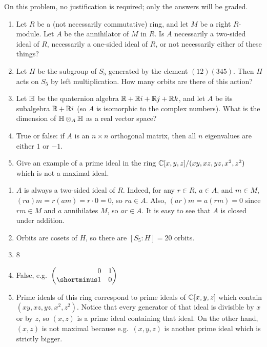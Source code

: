 \begin{question}[subtitle = {January 2025 Problem 1, edited},ID=Jan25_1]
On this problem, no justification is required; only the answers will be graded.
\begin{enumerate}
    \item Let $R$ be a (not necessarily commutative) ring, and let $M$ be a right $R$-module. Let $A$ be the annihilator of $M$ in $R$. Is $A$ necessarily a two-sided ideal of $R$, necessarily a one-sided ideal of $R$, or not necessarily either of these things?
    \item Let $H$ be the subgroup of $S_5$ generated by the element $(12)(345)$. Then $H$ acts on $S_5$ by left multiplication. How many orbits are there of this action?
    \item Let $\mathbb{H}$ be the quaternion algebra $\mathbb{R} + \mathbb{R} i + \mathbb{R} j + \mathbb{R} k$, and let $A$ be its subalgebra $\mathbb{R} + \mathbb{R} i$ (so $A$ is isomorphic to the complex numbers). What is the dimension of $\mathbb{H} \otimes_A \mathbb{H}$ as a real vector space?
    \item True or false: if $A$ is an $n \times n$ orthogonal matrix, then all $n$ eigenvalues are either $1$ or $-1$.
    \item Give an example of a prime ideal in the ring $\mathbb{C}[x,y,z]/(xy,xz,yz,x^2,z^2)$ which is not a maximal ideal.
\end{enumerate}
\end{question}
\begin{solution}
\begin{enumerate}
    \item $A$ is always a two-sided ideal of $R$. Indeed, for any $r \in R$, $a \in A$, and $m \in M$, $(ra)m = r(am) = r\cdot 0 = 0$, so $ra \in A$. Also, $(ar)m = a(rm) = 0$ since $rm \in M$ and $a$ annihilates $M$, so $ar \in A$. It is easy to see that $A$ is closed under addition.
    \item Orbits are cosets of $H$, so there are $[S_5:H] = 20$ orbits.
    \item 8
    \item False, e.g.\ $\begin{pmatrix*}[r] 0 & 1 \\ \shortminus 1 & 0 \end{pmatrix*}$
    \item Prime ideals of this ring correspond to prime ideals of $\mathbb{C}[x,y,z]$ which contain $(xy,xz,yz,x^2,z^2)$. Notice that every generator of that ideal is divisible by $x$ or by $z$, so $(x,z)$ is a prime ideal containing that ideal. On the other hand, $(x,z)$ is not maximal because e.g.\ $(x,y,z)$ is another prime ideal which is strictly bigger.
\end{enumerate}
\end{solution}

